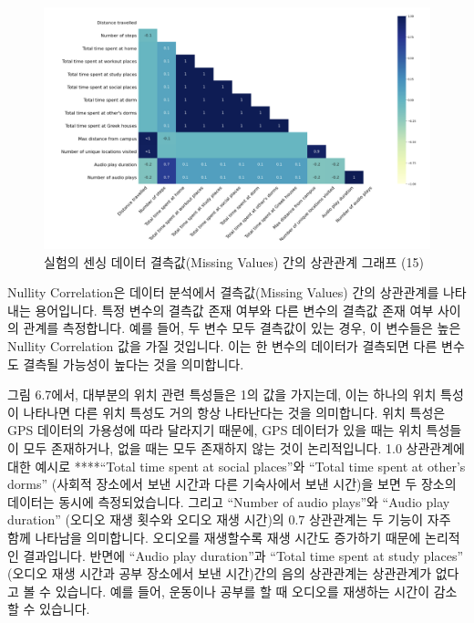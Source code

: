 \documentclass[
  letterpaper,
]{book}
\begin{document}
\begin{figure}[H]

{\centering \includegraphics{img/fig13.png}

}

\caption{실험의 센싱 데이터 결측값(Missing Values) 간의 상관관계 그래프
(15)}

\end{figure}%

Nullity Correlation은 데이터 분석에서 결측값(Missing Values) 간의
상관관계를 나타내는 용어입니다. 특정 변수의 결측값 존재 여부와 다른
변수의 결측값 존재 여부 사이의 관계를 측정합니다. 예를 들어, 두 변수
모두 결측값이 있는 경우, 이 변수들은 높은 Nullity Correlation 값을 가질
것입니다. 이는 한 변수의 데이터가 결측되면 다른 변수도 결측될 가능성이
높다는 것을 의미합니다.

그림 6.7에서, 대부분의 위치 관련 특성들은 1의 값을 가지는데, 이는 하나의
위치 특성이 나타나면 다른 위치 특성도 거의 항상 나타난다는 것을
의미합니다. 위치 특성은 GPS 데이터의 가용성에 따라 달라지기 때문에, GPS
데이터가 있을 때는 위치 특성들이 모두 존재하거나, 없을 때는 모두
존재하지 않는 것이 논리적입니다. 1.0 상관관계에 대한 예시로 ****``Total
time spent at social places''와 ``Total time spent at other's dorms''
(사회적 장소에서 보낸 시간과 다른 기숙사에서 보낸 시간)을 보면 두 장소의
데이터는 동시에 측정되었습니다. 그리고 ``Number of audio plays''와
``Audio play duration'' (오디오 재생 횟수와 오디오 재생 시간)의 0.7
상관관계는 두 기능이 자주 함께 나타남을 의미합니다. 오디오를 재생할수록
재생 시간도 증가하기 때문에 논리적인 결과입니다. 반면에 ``Audio play
duration''과 ``Total time spent at study places'' (오디오 재생 시간과
공부 장소에서 보낸 시간)간의 음의 상관관계는 상관관계가 없다고 볼 수
있습니다. 예를 들어, 운동이나 공부를 할 때 오디오를 재생하는 시간이
감소할 수 있습니다.
\end{document}
